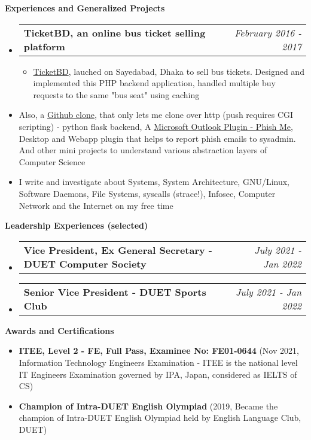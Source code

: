 \documentclass[letterpaper,10pt]{article}
\makeatletter
\newcommand{\resheading}[1]{{\large \colorbox{mygrey}{\begin{minipage}{\textwidth}{\textbf{#1 \vphantom{p\^{E}}}}\end{minipage}}}}
\newcommand{\ressubheading}[4]{
	\begin{tabular*}{7.1in}{l@{\extracolsep{\fill}}r}
		\textbf{#1} & \textit{#4} \\
	\end{tabular*}\vspace{-6pt}}
\makeatother
\begin{document}
	\vspace{0.08in}
	
	\resheading{Experiences and Generalized Projects}
	\begin{itemize}
	
		\item \ressubheading{TicketBD, an online bus ticket selling platform}{}{}{February 2016 - 2017}
		\begin{itemize} 
			\item \href{https://www.facebook.com/ticketbd.online}{TicketBD}, lauched on Sayedabad, Dhaka to sell bus tickets. Designed and implemented this PHP backend application, handled multiple buy requests to the same "bus seat" using caching
		\end{itemize}

		\item Also, a \href{https://ovebepari.github.io/linux\%7Csystems/i-made-my-own-github-not-really/}{Github clone}, that only lets me clone over http (push requires CGI scripting) - python flask backend, A \href{https://github.com/ovebepari/PhishMe}{Microsoft Outlook Plugin - Phish Me}, Desktop and Webapp plugin that helps to report phish emails to sysadmin. And other mini projects to understand various abstraction layers of Computer Science
		
		\item I write and investigate about Systems, System Architecture, GNU/Linux, Software Daemons, File Systems, syscalls (strace!), Infosec, Computer Network and the Internet on my free time
	\end{itemize}

	\vspace{0.08in}
	
	\resheading{Leadership Experiences (selected)}
	\begin{itemize}
		\item \ressubheading{Vice President, Ex General Secretary - DUET Computer Society}{}{}{July 2021 - Jan 2022}
		\item \ressubheading{Senior Vice President - DUET Sports Club}{}{}{July 2021 - Jan 2022}
		
	\end{itemize}

	\vspace{0.08in}
	
	\resheading{Awards and Certifications}
	\begin{itemize}
	
		\item \textbf{ITEE, Level 2 - FE, Full Pass, Examinee No: FE01-0644} (Nov 2021,  Information Technology Engineers Examination - ITEE is the national level IT Engineers Examination governed by IPA, Japan, considered as IELTS of CS) 
		
		\item \textbf{Champion of Intra-DUET English Olympiad} (2019, Became the champion of Intra-DUET English Olympiad held by English Language Club, DUET)

	\end{itemize}
\end{document}
